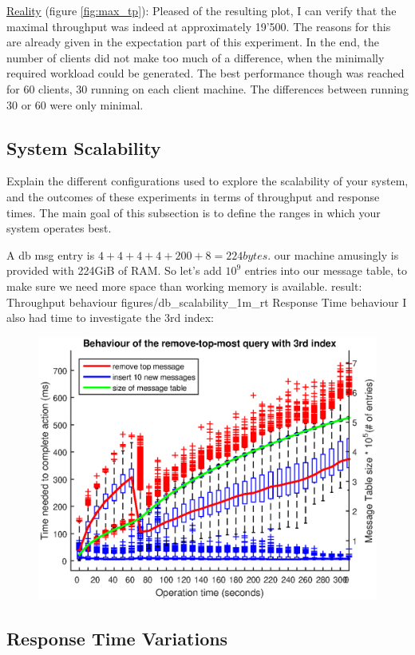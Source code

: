 \documentclass[11pt]{article}
\begin{document}
\newline\underline{Reality} (figure \ref{fig:max_tp}): Pleased of the resulting plot, I can verify that the maximal throughput was indeed at approximately 19'500. The reasons for this are already given in the expectation part of this experiment. In the end, the number of clients did not make too much of a difference, when the minimally required workload could be generated. The best performance though was reached for 60 clients, 30 running on each client machine. The differences between running 30 or 60 were only minimal.

\subsection{System Scalability}\label{sec:system-scalability}

Explain the different configurations used to explore the scalability of
your system, and the outcomes of these experiments in terms of
throughput and response times. The main goal of this subsection is to
define the ranges in which your system operates best.

A db msg entry is $4+4+4+4+200+8=224bytes$. our machine amusingly is provided with 224GiB of RAM. So let's add $10^9$ entries into our message table, to make sure we need more space than working memory is available.
result:
 {Throughput behaviour} {}
		{figures/db_scalability_1m_rt} {Response Time behaviour} {}
I also had time to investigate the 3rd index:
\begin{figure}[!htb]
\centering
\includegraphics[width=0.7\linewidth]{figures/database/third_index}
\caption{}
\label{fig:third_index}
\end{figure}

\subsection{Response Time Variations}\label{sec:response-time-variations}
\end{document}
